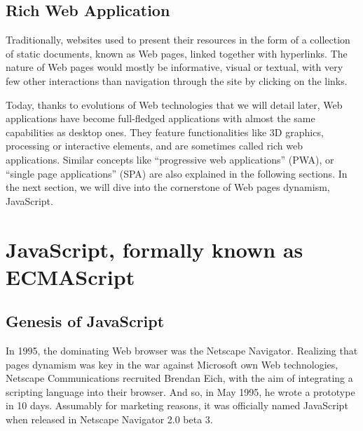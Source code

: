 



\subsection{Rich Web Application}%
\label{sub:rich_web_application}

Traditionally, websites used to present their resources in the form of a collection
of static documents, known as Web pages, linked together with hyperlinks.
The nature of Web pages would mostly be informative, visual or textual,
with very few other interactions than navigation through the site by
clicking on the links.

Today, thanks to evolutions of Web technologies that we will detail later,
Web applications have become full-fledged applications with almost
the same capabilities as desktop ones.
They feature functionalities like 3D graphics,  processing or interactive elements,
and are sometimes called rich web applications.
Similar concepts like ``progressive web applications'' (PWA),
or ``single page applications'' (SPA) are also explained in the following sections.
In the next section, we will dive into the cornerstone of Web pages dynamism, JavaScript.


\section{JavaScript, formally known as ECMAScript}%
\label{sec:javascript_formally_known_as_ecmascript}

\subsection{Genesis of JavaScript}%
\label{sub:genesis_of_javascript}

In 1995, the dominating Web browser was the Netscape Navigator.
Realizing that pages dynamism was key in the war against Microsoft
own Web technologies, Netscape Communications recruited Brendan Eich,
with the aim of integrating a scripting language into their browser.
And so, in May 1995, he wrote a prototype in 10 days.
Assumably for marketing reasons, it was officially named JavaScript
when released in Netscape Navigator 2.0 beta 3.

